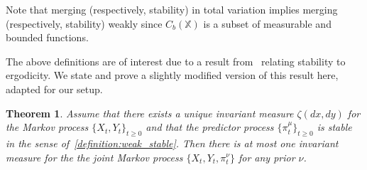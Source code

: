 \documentclass{article}
\newtheorem{theorem}{Theorem}[section]
\begin{document}
Note that merging (respectively, stability) in total variation implies merging (respectively, stability) weakly since \( C_b(\mathbb{X}) \) is a subset of measurable and bounded functions.

The above definitions are of interest due to a result from~\cite[Theorem 2]{Stettner} relating stability to ergodicity. We state and prove a slightly modified version of this result here, adapted for our setup.

\begin{theorem}\label{theorem:unique}
    Assume that there exists a unique invariant measure \( \zeta(dx,dy) \) for the Markov process \( \{X_t,Y_t\}_{t\ge0} \) and that the predictor process \( \{\pi_t^\mu \}_{t\ge0} \) is stable in the sense of~\ref{definition:weak_stable}. Then there is at most one invariant measure for the the joint Markov process \( \{X_t,Y_t,\pi_t^\nu \} \) for any prior \( \nu \). %
\end{theorem}
\end{document}
